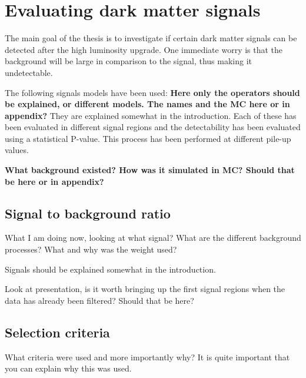 \section{Evaluating dark matter signals}
The main goal of the thesis is to investigate if certain dark matter signals can be detected after the high luminosity upgrade. One immediate worry is that the background will be large in comparison to the signal, thus making it undetectable. 

The following signals models have been used:
\textbf{Here only the operators should be explained, or different models. The names and the MC here or in appendix?} They are explained somewhat in the introduction.
Each of these has been evaluated in different signal regions and the detectability has been evaluated using a statistical P-value. This process has been performed at different pile-up values. 

\textbf{What background existed? How was it simulated in MC? Should that be here or in appendix?}


\subsection{Signal to background ratio}
What I am doing now, looking at what signal? What are the different background processes? What and why was the weight used?

Signals should be explained somewhat in the introduction.



Look at presentation, is it worth bringing up the first signal regions when the data has already been filtered? Should that be here?
 
\subsection{Selection criteria}
What criteria were used and more importantly why? It is quite important that you can explain why this was used.

